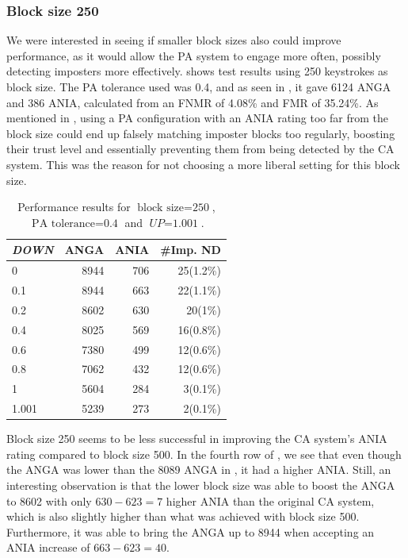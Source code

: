 \subsubsection{Block size 250}
We were interested in seeing if smaller block sizes also could improve performance, as it would allow the PA system to engage more often, possibly detecting imposters more effectively.
 shows test results using 250 keystrokes as block size.
The PA tolerance used was 0.4, and as seen in , it gave 6124 ANGA and 386 ANIA, calculated from an FNMR of 4.08\% and FMR of 35.24\%.
As mentioned in , using a PA configuration with an ANIA rating too far from the block size could end up falsely matching imposter blocks too regularly, boosting their trust level and essentially preventing them from being detected by the CA system.
This was the reason for not choosing a more liberal setting for this block size.

\begin{table}[ht]
\centering
\begin{tabular}{lrrr}
\hline
\textit{DOWN} & ANGA  & ANIA & \#Imp. ND \\ \hline
0     & 8944 & 706 & 25(1.2\%) \\
0.1   & 8944 & 663 & 22(1.1\%) \\
0.2   & 8602 & 630 & 20(1\%)   \\
0.4   & 8025 & 569 & 16(0.8\%) \\
0.6   & 7380 & 499 & 12(0.6\%) \\
0.8   & 7062 & 432 & 12(0.6\%) \\
1     & 5604 & 284 & 3(0.1\%)  \\
1.001 & 5239 & 273 & 2(0.1\%) 
\end{tabular}
\caption{Performance results for $\text{block size} = \text{250}$, $\text{PA tolerance} = \text{0.4}$ and $\textit{UP} = \text{1.001}$.}
\label{tab:decision-level-BL250}
\end{table}

Block size 250 seems to be less successful in improving the CA system's ANIA rating compared to block size 500. 
In the fourth row of , we see that even though the ANGA was lower than the 8089 ANGA in , it had a higher ANIA.
Still, an interesting observation is that the lower block size was able to boost the ANGA to 8602 with only $\text{630}-\text{623} = \text{7}$ higher ANIA than the original CA system, which is also slightly higher than what was achieved with block size 500.
Furthermore, it was able to bring the ANGA up to 8944 when accepting an ANIA increase of $\text{663}-\text{623}=\text{40}$.

